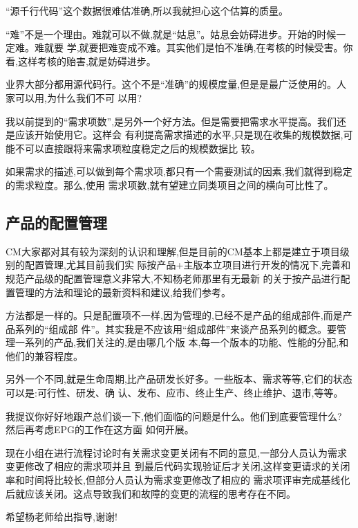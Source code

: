 \documentclass[11pt]{article}
\begin{document}
\qlogo \begin{staff}
``源千行代码''这个数据很难估准确,所以我就担心这个估算的质量。
\end{staff}

\begin{yang}
  \ylogo ``难''不是一个理由。难就可以不做,就是``姑息''。姑息会妨碍进步。开始的时候一定难。难就要
  学,就要把难变成不难。其实他们是怕不准确,在考核的时候受害。你看,这样考核的贻害,就是妨碍进步。

  业界大部分都用源代码行。这个不是``准确''的规模度量,但是是最广泛使用的。人家可以用,为什么我们不可
  以用?

  我以前提到的``需求项数'',是另外一个好方法。但是需要把需求水平提高。我们还是应该开始使用它。这样会
  有利提高需求描述的水平,只是现在收集的规模数据,可能不可以直接跟将来需求项粒度稳定之后的规模数据比
  较。

  如果需求的描述,可以做到每个需求项,都只有一个需要测试的因素,我们就得到稳定的需求粒度。那么,使用
  需求项数,就有望建立同类项目之间的横向可比性了。
\end{yang}

\subsection{产品的配置管理}
\qlogo \begin{staff}
  CM大家都对其有较为深刻的认识和理解,但是目前的CM基本上都是建立于项目级别的配置管理,尤其目前我们实
  际按产品+主版本立项目进行开发的情况下,完善和规范产品级的配置管理意义非常大,不知杨老师那里有无最新
  的关于按产品进行配置管理的方法和理论的最新资料和建议,给我们参考。
\end{staff}

\begin{yang}
  \ylogo 方法都是一样的。只是配置项不一样,因为管理的,已经不是产品的组成部件,而是产品系列的``组成部
  件''。其实我是不应该用``组成部件''来谈产品系列的概念。要管理一系列的产品,我们关注的,是由哪几个版
  本,每一个版本的功能、性能的分配,和他们的兼容程度。

  另外一个不同,就是生命周期,比产品研发长好多。一些版本、需求等等,它们的状态可以是:可行性、研发、确
  认、发布、应市、终止生产、终止维护、退市,等等。

  我提议你好好地跟产总们谈一下,他们面临的问题是什么。他们到底要管理什么? 然后再考虑EPG的工作在这方面
  如何开展。
\end{yang}

\qlogo \begin{staff}
  现在小组在进行流程讨论时有关需求变更关闭有不同的意见,一部分人员认为需求变更修改了相应的需求项并且
  到最后代码实现验证后才关闭,这样变更请求的关闭率和时间将比较长,但部分人员认为需求变更修改了相应的
  需求项评审完成基线化后就应该关闭。这点导致我们和故障的变更的流程的思考存在不同。

  希望杨老师给出指导,谢谢!

\end{staff}
\end{document}
